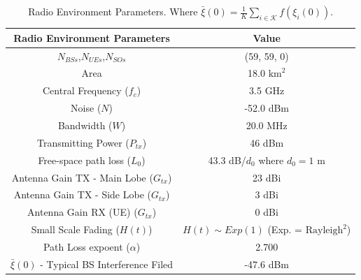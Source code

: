 \begin{table}[H]\centering
\caption{Radio Environment Parameters. Where $\bar \xi(0) =  \frac{1}{K} \sum\limits_{i \in \mathcal{K}} f\left(\xi_i(0)\right)$.}
\label{tab:Radio Environment Parameters}
\begin{tabular}{|c|c|}
\toprule
\textbf{Radio Environment Parameters} & \textbf{Value} \\
\midrule
$N_{BSs}$,$N_{UEs}$,$N_{SOs}$ & (59, 59, 0) \\
Area & 18.0 $\text{km}^2$ \\
Central Frequency ($f_c$) & 3.5 GHz \\
Noise ($N$) & -52.0 dBm \\
Bandwidth ($W$) & 20.0 MHz \\
Transmitting Power ($P_{tx}$) & 46 dBm \\
Free-space path loss ($L_{0}$) & 43.3 dB/$d_{0}$ where $d_{0} = 1$ m \\
Antenna Gain TX - Main Lobe ($G_{tx}$) & 23 dBi \\
Antenna Gain TX - Side Lobe ($G_{tx}$) & 3 dBi \\
Antenna Gain RX (UE) ($G_{tx}$) & 0 dBi \\
Small Scale Fading ($H(t)$) & $H(t) \sim Exp(1)$ (Exp. = $\text{Rayleigh}^2$) \\
Path Loss expoent ($\alpha$) & 2.700 \\
$\bar \xi(0)$ - Typical BS Interference Filed & -47.6 dBm \\
\bottomrule
\end{tabular}
\end{table}
